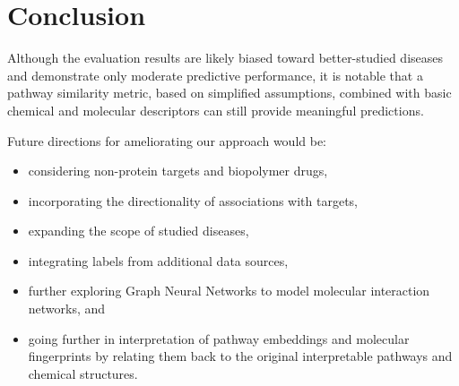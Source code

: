 \section{Conclusion}

Although the evaluation results are likely biased toward better-studied diseases and 
demonstrate only moderate predictive performance, 
it is notable that a pathway similarity metric, based on simplified assumptions, combined with basic 
chemical and molecular descriptors can still provide meaningful predictions.

Future directions for ameliorating our approach would be:
\begin{itemize}[nosep]
    \item considering non-protein targets and biopolymer drugs,
    \item incorporating the directionality of associations with targets,
    \item expanding the scope of studied diseases,
    \item integrating labels from additional data sources,
    \item further exploring Graph Neural Networks to model molecular interaction networks, and
    \item going further in interpretation of pathway embeddings and molecular fingerprints by
     relating them back to the original interpretable pathways and chemical structures.
\end{itemize}
